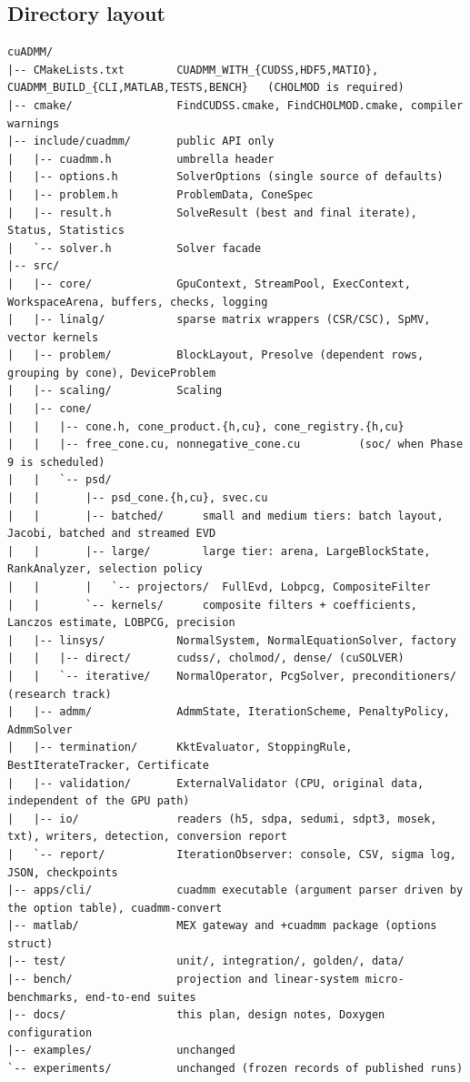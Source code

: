 \documentclass[11pt]{article}
\begin{document}
\subsection{Directory layout}
\begin{lstlisting}[style=plain]
cuADMM/
|-- CMakeLists.txt        CUADMM_WITH_{CUDSS,HDF5,MATIO}, CUADMM_BUILD_{CLI,MATLAB,TESTS,BENCH}   (CHOLMOD is required)
|-- cmake/                FindCUDSS.cmake, FindCHOLMOD.cmake, compiler warnings
|-- include/cuadmm/       public API only
|   |-- cuadmm.h          umbrella header
|   |-- options.h         SolverOptions (single source of defaults)
|   |-- problem.h         ProblemData, ConeSpec
|   |-- result.h          SolveResult (best and final iterate), Status, Statistics
|   `-- solver.h          Solver facade
|-- src/
|   |-- core/             GpuContext, StreamPool, ExecContext, WorkspaceArena, buffers, checks, logging
|   |-- linalg/           sparse matrix wrappers (CSR/CSC), SpMV, vector kernels
|   |-- problem/          BlockLayout, Presolve (dependent rows, grouping by cone), DeviceProblem
|   |-- scaling/          Scaling
|   |-- cone/
|   |   |-- cone.h, cone_product.{h,cu}, cone_registry.{h,cu}
|   |   |-- free_cone.cu, nonnegative_cone.cu         (soc/ when Phase 9 is scheduled)
|   |   `-- psd/
|   |       |-- psd_cone.{h,cu}, svec.cu
|   |       |-- batched/      small and medium tiers: batch layout, Jacobi, batched and streamed EVD
|   |       |-- large/        large tier: arena, LargeBlockState, RankAnalyzer, selection policy
|   |       |   `-- projectors/  FullEvd, Lobpcg, CompositeFilter
|   |       `-- kernels/      composite filters + coefficients, Lanczos estimate, LOBPCG, precision
|   |-- linsys/           NormalSystem, NormalEquationSolver, factory
|   |   |-- direct/       cudss/, cholmod/, dense/ (cuSOLVER)
|   |   `-- iterative/    NormalOperator, PcgSolver, preconditioners/   (research track)
|   |-- admm/             AdmmState, IterationScheme, PenaltyPolicy, AdmmSolver
|   |-- termination/      KktEvaluator, StoppingRule, BestIterateTracker, Certificate
|   |-- validation/       ExternalValidator (CPU, original data, independent of the GPU path)
|   |-- io/               readers (h5, sdpa, sedumi, sdpt3, mosek, txt), writers, detection, conversion report
|   `-- report/           IterationObserver: console, CSV, sigma log, JSON, checkpoints
|-- apps/cli/             cuadmm executable (argument parser driven by the option table), cuadmm-convert
|-- matlab/               MEX gateway and +cuadmm package (options struct)
|-- test/                 unit/, integration/, golden/, data/
|-- bench/                projection and linear-system micro-benchmarks, end-to-end suites
|-- docs/                 this plan, design notes, Doxygen configuration
|-- examples/             unchanged
`-- experiments/          unchanged (frozen records of published runs)
\end{lstlisting}
\end{document}

